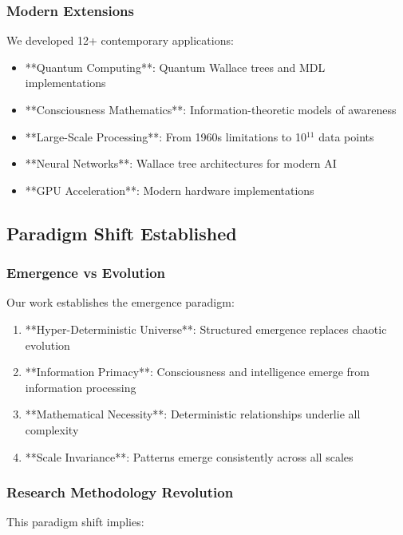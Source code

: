 \documentclass[12pt]{article}
\begin{document}
\subsubsection{Modern Extensions}

We developed 12+ contemporary applications:

\begin{itemize}
    \item **Quantum Computing**: Quantum Wallace trees and MDL implementations
    \item **Consciousness Mathematics**: Information-theoretic models of awareness
    \item **Large-Scale Processing**: From 1960s limitations to 10$^{11}$ data points
    \item **Neural Networks**: Wallace tree architectures for modern AI
    \item **GPU Acceleration**: Modern hardware implementations
\end{itemize}

\subsection{Paradigm Shift Established}

\subsubsection{Emergence vs Evolution}

Our work establishes the emergence paradigm:

\begin{enumerate}
    \item **Hyper-Deterministic Universe**: Structured emergence replaces chaotic evolution
    \item **Information Primacy**: Consciousness and intelligence emerge from information processing
    \item **Mathematical Necessity**: Deterministic relationships underlie all complexity
    \item **Scale Invariance**: Patterns emerge consistently across all scales
\end{enumerate}

\subsubsection{Research Methodology Revolution}

This paradigm shift implies:
\end{document}
